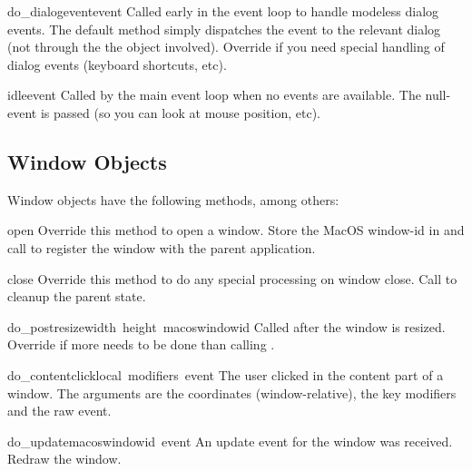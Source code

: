 \begin{funcdesc}{do_dialogevent}{event}
Called early in the event loop to handle modeless dialog events. The
default method simply dispatches the event to the relevant dialog (not
through the the  object involved). Override if you
need special handling of dialog events (keyboard shortcuts, etc).
\end{funcdesc}

\begin{funcdesc}{idle}{event}
Called by the main event loop when no events are available. The
null-event is passed (so you can look at mouse position, etc).
\end{funcdesc}

\subsection{Window Objects}

Window objects have the following methods, among others:

\renewcommand{\indexsubitem}{(Window method)}

\begin{funcdesc}{open}{}
Override this method to open a window. Store the MacOS window-id in
 and call  to register the
window with the parent application.
\end{funcdesc}

\begin{funcdesc}{close}{}
Override this method to do any special processing on window
close. Call  to cleanup the parent state.
\end{funcdesc}

\begin{funcdesc}{do_postresize}{width\, height\, macoswindowid}
Called after the window is resized. Override if more needs to be done
than calling .
\end{funcdesc}

\begin{funcdesc}{do_contentclick}{local\, modifiers\, event}
The user clicked in the content part of a window. The arguments are
the coordinates (window-relative), the key modifiers and the raw
event.
\end{funcdesc}

\begin{funcdesc}{do_update}{macoswindowid\, event}
An update event for the window was received. Redraw the window.
\end{funcdesc}

